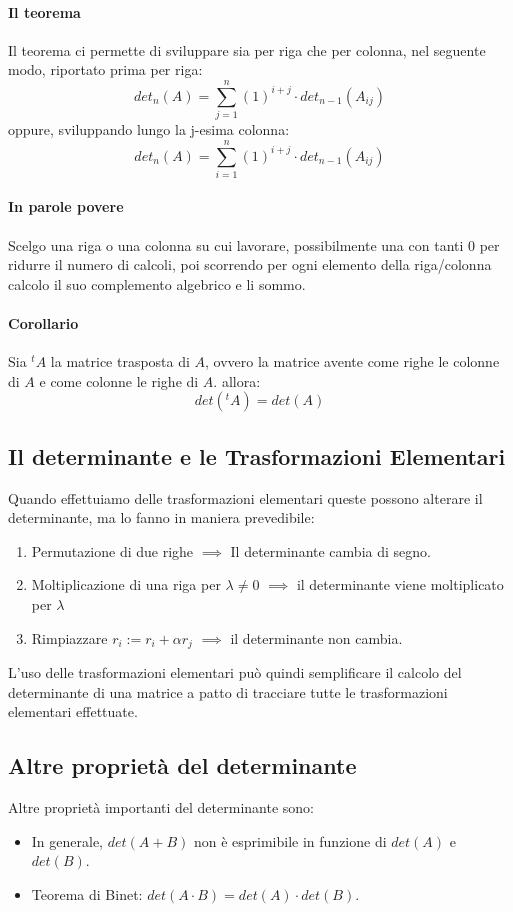\paragraph{Il teorema}
Il teorema ci permette di sviluppare sia per riga che per colonna, nel seguente modo, riportato prima per riga:
\[det_n(A) = \sum_{j=1}^{n} (1)^{i+j} \cdot det_{n-1}(A_{ij})\]
oppure, sviluppando lungo la j-esima colonna:
\[det_n(A) = \sum_{i=1}^{n} (1)^{i+j} \cdot det_{n-1}(A_{ij})\]

\paragraph{In parole povere}
Scelgo una riga o una colonna su cui lavorare, possibilmente una con tanti 0 per ridurre il numero di calcoli,
poi scorrendo per ogni elemento della riga/colonna calcolo il suo complemento algebrico e li sommo.

\paragraph{Corollario}
Sia $^tA$ la matrice trasposta di $A$, ovvero la matrice avente come righe le colonne di $A$ e come colonne le righe di $A$. allora:
\[ det(^tA) = det(A)\]

\subsection{Il determinante e le Trasformazioni Elementari}
Quando effettuiamo delle trasformazioni elementari queste possono alterare il determinante, ma lo fanno in maniera prevedibile:
\begin{enumerate}
	\item Permutazione di due righe $\implies$ Il determinante cambia di segno.
	\item Moltiplicazione di una riga per $\lambda \neq 0$  $\implies$ il determinante viene moltiplicato per $\lambda$
	\item Rimpiazzare $r_i := r_i + \alpha r_j$ $\implies$ il determinante non cambia.
\end{enumerate}
L'uso delle trasformazioni elementari può quindi semplificare il calcolo del determinante di una matrice a patto di tracciare tutte le trasformazioni elementari effettuate.

\subsection{Altre proprietà del determinante}
Altre proprietà importanti del determinante sono:
\begin{itemize}
	\item In generale, $det(A+B)$ non è esprimibile in funzione di $det(A)$ e $det(B)$.
	\item Teorema di Binet: $det(A\cdot B) = det(A)\cdot det(B)$.
\end{itemize}

